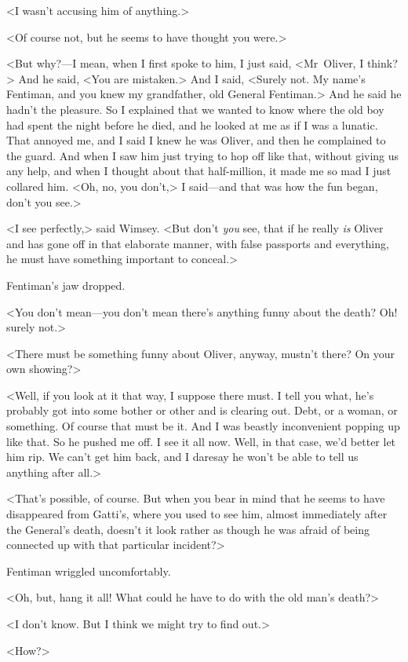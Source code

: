 <I wasn't accusing him of anything.>

<Of course not, but he seems to have thought you were.>

<But why?—I mean, when I first spoke to him, I just said, <Mr~Oliver, I think?> And he said, <You are mistaken.> And I said, <Surely not. My name's Fentiman, and you knew my grandfather, old General Fentiman.> And he said he hadn't the pleasure. So I explained that we wanted to know where the old boy had spent the night before he died, and he looked at me as if I was a lunatic. That annoyed me, and I said I knew he was Oliver, and then he complained to the guard. And when I saw him just trying to hop off like that, without giving us any help, and when I thought about that half-million, it made me so mad I just collared him. <Oh, no, you don't,> I said—and that was how the fun began, don't you see.>

<I see perfectly,> said Wimsey. <But don't \emph{you} see, that if he really \emph{is} Oliver and has gone off in that elaborate manner, with false passports and everything, he must have something important to conceal.>

Fentiman's jaw dropped.

<You don't mean—you don't mean there's anything funny about the death? Oh! surely not.>

<There must be something funny about Oliver, anyway, mustn't there? On your own showing?>

<Well, if you look at it that way, I suppose there must. I tell you what, he's probably got into some bother or other and is clearing out. Debt, or a woman, or something. Of course that must be it. And I was beastly inconvenient popping up like that. So he pushed me off. I see it all now. Well, in that case, we'd better let him rip. We can't get him back, and I daresay he won't be able to tell us anything after all.>

<That's possible, of course. But when you bear in mind that he seems to have disappeared from Gatti's, where you used to see him, almost immediately after the General's death, doesn't it look rather as though he was afraid of being connected up with that particular incident?>

Fentiman wriggled uncomfortably.

<Oh, but, hang it all! What could he have to do with the old man's death?>

<I don't know. But I think we might try to find out.>

<How?>

